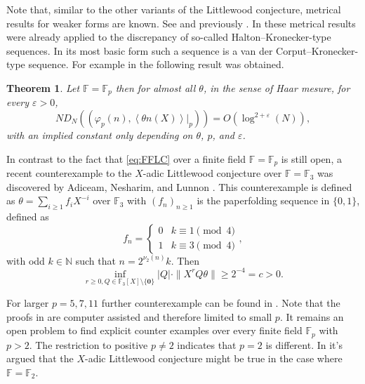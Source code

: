 \documentclass{article}
\newcommand{\NN}{\mathbb N}
\newcommand{\FF}{\mathbb{F}}
\renewcommand{\(}{\left (}
\renewcommand{\)}{\right )}
\newtheorem{theorem}{Theorem}[section]
\theoremstyle{definition}
\numberwithin{equation}{section}
\begin{document}
Note that, similar to the other variants of the Littlewood conjecture, metrical results for weaker forms are known. See \cite{Robertson} and previously \cite{HoferdigKH}. In \cite{HoferdigKH} these metrical results were already applied to the discrepancy of so-called Halton--Kronecker-type sequences. In its most basic form such a sequence is a van der Corput--Kronecker-type sequence. For example in \cite{HoferdigKH} the following result was obtained. 


\begin{theorem}
	Let $\FF=\FF_p$ then for almost all $\theta$, in the sense of Haar mesure, for every $\varepsilon>0$,
	$$ND_N((\varphi_p(n),{\left<  \theta n(X)\right>}|_p))=O(\log^{2+\varepsilon}(N)),$$
		with an implied constant only depending on $\theta$, $p$, and $\varepsilon$.
\end{theorem}


In contrast to the fact that \eqref{eq:FFLC} over a finite field $\FF=\FF_p$ is still open, a recent counterexample to the $X$-adic Littlewood conjecture over $\FF=\FF_3$ was discovered by Adiceam, Nesharim, and Lunnon \cite{Adiceametal}. This counterexample is defined as $\theta=\sum_{i\geq 1}f_iX^{-i}$ over $\FF_3$ with $(f_n)_{n\geq 1}$ is the paperfolding sequence in $\{0,1\}$, defined as 
$$f_n=\left\{ \begin{array}{cc} 0&k\equiv 1\pmod{4}\\
1& k\equiv 3\pmod{4}
	\end{array}\right.,$$
	with odd $k\in\NN$ such that $n=2^{\nu_2(n)}k$. 
Then $$\inf_{r\geq 0,Q\in\FF_3[X]\setminus\{\boldsymbol{0}\}} |Q| \cdot\|X^rQ\theta\|\geq 2^{-4}=c>0.$$ 

For larger $p=5,7,11$ further counterexample can be found in \cite{GR}. Note that the proofs in \cite{Adiceametal,GR} are computer assisted and therefore limited to small $p$. 
It remains an open problem to find explicit counter examples over every finite field $\FF_p$ with $p>2$. The restriction to positive $p\neq 2$ indicates that $p=2$ is different. In \cite[Conjecture~1.8]{GR} it's argued that the $X$-adic Littlewood conjecture might be true in the case where $\FF=\FF_2$. 
\end{document}
